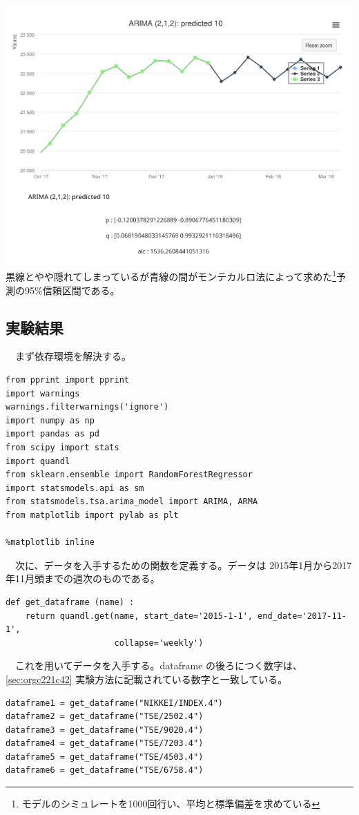 \documentclass{scrartcl}
\begin{document}
\newpage
\includegraphics [width=16cm] {./rect1673.png}
　黒線とやや隠れてしまっているが青線の間がモンテカルロ法によって求めた\footnote{モデルのシミュレートを1000回行い、平均と標準偏差を求めている}予測の95\%信頼区間である。\\
\newpage

\subsection{実験結果}
\label{sec:org4f2ffe7}
　まず依存環境を解決する。\\
\begin{verbatim}
from pprint import pprint
import warnings
warnings.filterwarnings('ignore')
import numpy as np
import pandas as pd
from scipy import stats
import quandl
from sklearn.ensemble import RandomForestRegressor
import statsmodels.api as sm
from statsmodels.tsa.arima_model import ARIMA, ARMA
from matplotlib import pylab as plt

%matplotlib inline
\end{verbatim}

　次に、データを入手するための関数を定義する。データは 2015年1月から2017年11月頭までの週次のものである。\\
\begin{verbatim}
def get_dataframe (name) :
    return quandl.get(name, start_date='2015-1-1', end_date='2017-11-1',
                      collapse='weekly')
\end{verbatim}

　これを用いてデータを入手する。dataframe の後ろにつく数字は、 \ref{sec:orgc221c42} 実験方法に記載されている数字と一致している。\\
\begin{verbatim}
dataframe1 = get_dataframe("NIKKEI/INDEX.4")
dataframe2 = get_dataframe("TSE/2502.4")
dataframe3 = get_dataframe("TSE/9020.4")
dataframe4 = get_dataframe("TSE/7203.4")
dataframe5 = get_dataframe("TSE/4503.4")
dataframe6 = get_dataframe("TSE/6758.4")
\end{verbatim}
\end{document}
